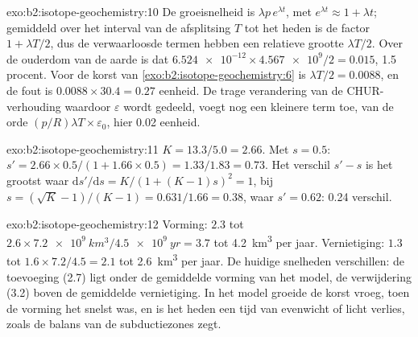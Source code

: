 \begin{solution}{exo:b2:isotope-geochemistry:10}
De groeisnelheid is $\lambda p\,e^{\lambda t}$, met $e^{\lambda t} \approx 1 + \lambda t$;
gemiddeld over het interval van de afsplitsing $T$ tot het heden is de factor
$1 + \lambda T/2$, dus de verwaarloosde termen hebben een relatieve grootte $\lambda T/2$. Over de
ouderdom van de aarde is dat $\num{6.524e-12}\times\num{4.567e9}/2 = 0.015$, 1.5 procent. Voor de
korst van \cref{exo:b2:isotope-geochemistry:6} is $\lambda T/2 = 0.0088$, en de fout is $0.0088\times30.4 = 0.27$
eenheid. De trage verandering van de CHUR-verhouding waardoor $\varepsilon$ wordt gedeeld, voegt
nog een kleinere term toe, van de orde $(p/R)\lambda T \times \varepsilon_0$, hier 0.02 eenheid.
\end{solution}

\begin{solution}{exo:b2:isotope-geochemistry:11}
$K = 13.3/5.0 = 2.66$. Met $s = 0.5$: $s' = 2.66\times0.5/(1 + 1.66\times0.5) =
1.33/1.83 = 0.73$. Het verschil $s' - s$ is het grootst waar
$\mathrm{d}s'/\mathrm{d}s = K/(1+(K-1)s)^2 = 1$, bij $s = (\sqrt K - 1)/(K-1) =
0.631/1.66 = 0.38$, waar $s' = 0.62$: 0.24 verschil.
\end{solution}

\begin{solution}{exo:b2:isotope-geochemistry:12}
Vorming: $2.3$ tot $2.6\times\qty{7.2e9}{km^3}/\qty{4.5e9}{yr} = 3.7$ tot
\qty{4.2}{km^3} per jaar. Vernietiging: $1.3$ tot $1.6\times7.2/4.5 = 2.1$ tot
\qty{2.6}{km^3} per jaar. De huidige snelheden verschillen: de toevoeging (2.7) ligt onder de gemiddelde
vorming van het model, de verwijdering (3.2) boven de gemiddelde vernietiging. In het model groeide de korst
vroeg, toen de vorming het snelst was, en is het heden een tijd van evenwicht of licht
verlies, zoals de balans van de subductiezones zegt.
\end{solution}


